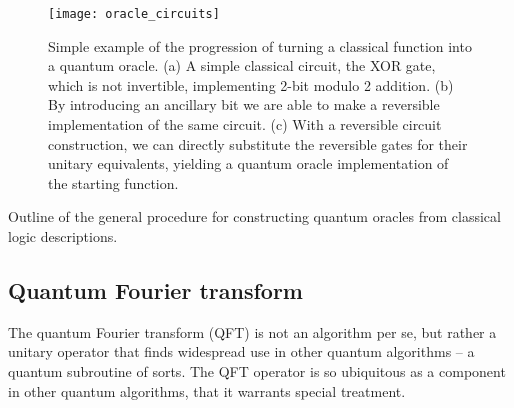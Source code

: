\begin{figure}[!htbp]
\texttt{[image: oracle\_circuits]}
\captionspacefig \caption{Simple example of the progression of turning a classical function into a quantum oracle. (a) A simple classical circuit, the XOR gate, which is not invertible, implementing 2-bit modulo 2 addition. (b) By introducing an ancillary bit we are able to make a reversible implementation of the same circuit. (c) With a reversible circuit construction, we can directly substitute the reversible gates for their unitary equivalents, yielding a quantum oracle implementation of the starting function.}\label{fig:oracle_circ}	
\end{figure}

\begin{table}[!htbp]
\captionspacealg \caption{Outline of the general procedure for constructing quantum oracles from classical logic descriptions.} \label{alg:oracle_const}
\end{table}

%
%

\subsection{Quantum Fourier transform}\label{sec:QFT_alg}

The quantum Fourier transform (QFT) is not an algorithm per se, but rather a unitary operator that finds widespread use in other quantum algorithms -- a quantum subroutine of sorts. The QFT operator is so ubiquitous as a component in other quantum algorithms, that it warrants special treatment.

